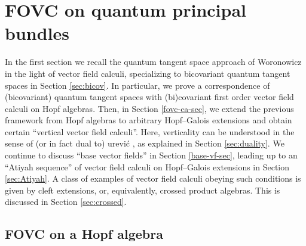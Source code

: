 \documentclass{article}
\theoremstyle{definition}
\begin{document}
	\section{FOVC on quantum principal bundles}\label{sec-ex}
	
	In the first section we recall the quantum tangent space approach \cite{Woronowicz1989} of Woronowicz in the light of vector field calculi, specializing to bicovariant quantum tangent spaces in Section \ref{sec:bicov}. In particular, we prove a correspondence of (bicovariant) quantum tangent spaces with (bi)covariant first order vector field calculi on Hopf algebras. Then, in Section \ref{fovc-ca-sec}, we extend the previous framework from Hopf algebras to 
	arbitrary Hopf--Galois extensions and obtain certain ``vertical vector field calculi''. Here, verticality can be understood in the sense of (or in fact dual to) \DJ ur\dj evi\'c \cite{DurII}, as explained in Section \ref{sec:duality}. We continue to discuss ``base vector fields'' in Section \ref{base-vf-sec}, leading up to an ``Atiyah sequence'' of vector field calculi on Hopf--Galois extensions in Section \ref{sec:Atiyah}. A class of examples of vector field calculi obeying such conditions is given by cleft extensions, or, equivalently, crossed product algebras. This is discussed in Section \ref{sec:crossed}.
	
	\subsection{FOVC on a Hopf algebra}
	\label{fovc-h}
	
\end{document}
